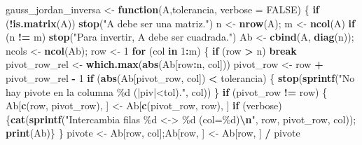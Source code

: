 \documentclass[
]{book}
\newenvironment{Shaded}{\begin{snugshade}}{\end{snugshade}}
\newcommand{\AttributeTok}[1]{\textcolor[rgb]{0.13,0.29,0.53}{#1}}
\newcommand{\ConstantTok}[1]{\textcolor[rgb]{0.56,0.35,0.01}{#1}}
\newcommand{\ControlFlowTok}[1]{\textcolor[rgb]{0.13,0.29,0.53}{\textbf{#1}}}
\newcommand{\DecValTok}[1]{\textcolor[rgb]{0.00,0.00,0.81}{#1}}
\newcommand{\FunctionTok}[1]{\textcolor[rgb]{0.13,0.29,0.53}{\textbf{#1}}}
\newcommand{\NormalTok}[1]{#1}
\newcommand{\OtherTok}[1]{\textcolor[rgb]{0.56,0.35,0.01}{#1}}
\newcommand{\SpecialCharTok}[1]{\textcolor[rgb]{0.81,0.36,0.00}{\textbf{#1}}}
\newcommand{\StringTok}[1]{\textcolor[rgb]{0.31,0.60,0.02}{#1}}
\begin{document}
\begin{Shaded}
\begin{Highlighting}[]
\NormalTok{gauss\_jordan\_inversa }\OtherTok{\textless{}{-}} \ControlFlowTok{function}\NormalTok{(A,tolerancia, }\AttributeTok{verbose =} \ConstantTok{FALSE}\NormalTok{) \{}
  \ControlFlowTok{if}\NormalTok{ (}\SpecialCharTok{!}\FunctionTok{is.matrix}\NormalTok{(A)) }\FunctionTok{stop}\NormalTok{(}\StringTok{"A debe ser una matriz."}\NormalTok{)}
\NormalTok{  n }\OtherTok{\textless{}{-}} \FunctionTok{nrow}\NormalTok{(A); m }\OtherTok{\textless{}{-}} \FunctionTok{ncol}\NormalTok{(A)}
  \ControlFlowTok{if}\NormalTok{ (n }\SpecialCharTok{!=}\NormalTok{ m) }\FunctionTok{stop}\NormalTok{(}\StringTok{"Para invertir, A debe ser cuadrada."}\NormalTok{)}
\NormalTok{  Ab }\OtherTok{\textless{}{-}} \FunctionTok{cbind}\NormalTok{(A, }\FunctionTok{diag}\NormalTok{(n)); ncols }\OtherTok{\textless{}{-}} \FunctionTok{ncol}\NormalTok{(Ab);  row }\OtherTok{\textless{}{-}} \DecValTok{1}
  \ControlFlowTok{for}\NormalTok{ (col }\ControlFlowTok{in} \DecValTok{1}\SpecialCharTok{:}\NormalTok{m) \{}
    \ControlFlowTok{if}\NormalTok{ (row }\SpecialCharTok{\textgreater{}}\NormalTok{ n) }\ControlFlowTok{break}
\NormalTok{    pivot\_row\_rel }\OtherTok{\textless{}{-}} \FunctionTok{which.max}\NormalTok{(}\FunctionTok{abs}\NormalTok{(Ab[row}\SpecialCharTok{:}\NormalTok{n, col]))}
\NormalTok{    pivot\_row }\OtherTok{\textless{}{-}}\NormalTok{ row }\SpecialCharTok{+}\NormalTok{ pivot\_row\_rel }\SpecialCharTok{{-}} \DecValTok{1}
    \ControlFlowTok{if}\NormalTok{ (}\FunctionTok{abs}\NormalTok{(Ab[pivot\_row, col]) }\SpecialCharTok{\textless{}}\NormalTok{ tolerancia) \{}
      \FunctionTok{stop}\NormalTok{(}\FunctionTok{sprintf}\NormalTok{(}\StringTok{"No hay pivote en la columna \%d (|piv|\textless{}tol)."}\NormalTok{, col))}
\NormalTok{    \}}
    \ControlFlowTok{if}\NormalTok{ (pivot\_row }\SpecialCharTok{!=}\NormalTok{ row) \{}
\NormalTok{      Ab[}\FunctionTok{c}\NormalTok{(row, pivot\_row), ] }\OtherTok{\textless{}{-}}\NormalTok{ Ab[}\FunctionTok{c}\NormalTok{(pivot\_row, row), ]}
      \ControlFlowTok{if}\NormalTok{ (verbose) \{}\FunctionTok{cat}\NormalTok{(}\FunctionTok{sprintf}\NormalTok{(}\StringTok{"Intercambia filas \%d \textless{}{-}\textgreater{} \%d (col=\%d)}\SpecialCharTok{\textbackslash{}n}\StringTok{"}\NormalTok{, row, pivot\_row, col)); }\FunctionTok{print}\NormalTok{(Ab)\}}
\NormalTok{    \}}
\NormalTok{    pivote }\OtherTok{\textless{}{-}}\NormalTok{ Ab[row, col];Ab[row, ] }\OtherTok{\textless{}{-}}\NormalTok{ Ab[row, ] }\SpecialCharTok{/}\NormalTok{ pivote}

\end{Highlighting}
\end{Shaded}
\end{document}
